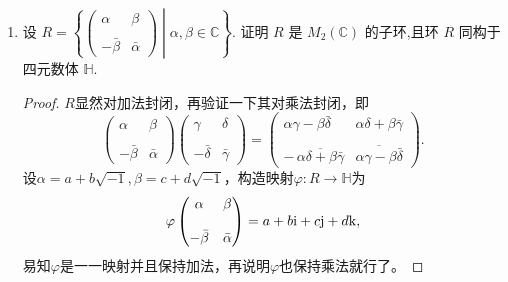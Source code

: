 \begin{enumerate}
\item 设 $ R = 
\left\{
\begin{pmatrix}
\alpha & \beta \\ \\
-\bar{\beta} & \bar{\alpha}
\end{pmatrix}
\middle|\alpha, \beta \in \mathbb{C} \right\}$.
证明 $ R $ 是 $ M_2(\mathbb{C}) $ 的子环,且环 $ R $ 同构于四元数体 $ \mathbb{H} $.
\begin{proof}
    $R$显然对加法封闭，再验证一下其对乘法封闭，即
    \[\begin{pmatrix}\alpha&\beta\\ \\-\bar{\beta}&\bar{\alpha}\end{pmatrix}
    \begin{pmatrix}\gamma&\delta\\ \\-\bar{\delta}&\bar{\gamma}\end{pmatrix}
    =\begin{pmatrix}\alpha\gamma-\beta\bar{\delta}&\alpha\delta+\beta\bar{\gamma}\\ \\
    -\,\overline{\alpha\delta+\beta\bar{\gamma}}&\overline{\alpha\gamma-\beta\bar{\delta}}\end{pmatrix}.\]
    设$\alpha=a+b\sqrt{-1},\beta=c+d\sqrt{-1}$，构造映射$\varphi:R\to\mathbb{H}$为
    \[\varphi\begin{pmatrix}\alpha&\beta\\ \\-\bar{\beta}&\bar{\alpha}\end{pmatrix}
    =a+b{\rm i}+c{\rm j}+d{\rm k},\]
    易知$\varphi$是一一映射并且保持加法，再说明$\varphi$也保持乘法就行了。


\end{proof}
\end{enumerate}
